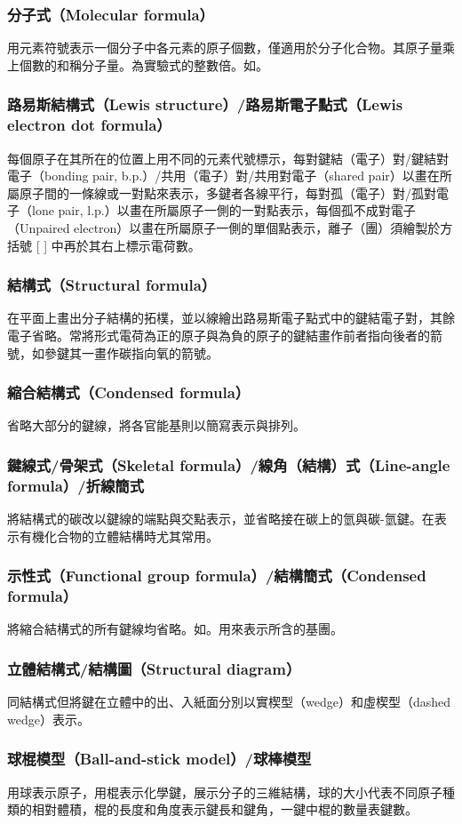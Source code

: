 \documentclass[a4paper,12pt]{article}
\begin{document}
\subsubsection{分子式（Molecular formula）}
用元素符號表示一個分子中各元素的原子個數，僅適用於分子化合物。其原子量乘上個數的和稱分子量。為實驗式的整數倍。如。
\subsubsection{路易斯結構式（Lewis structure）/路易斯電子點式（Lewis electron dot formula）}
每個原子在其所在的位置上用不同的元素代號標示，每對鍵結（電子）對/鍵結對電子（bonding pair, b.p.）/共用（電子）對/共用對電子（shared pair）以畫在所屬原子間的一條線或一對點來表示，多鍵者各線平行，每對孤（電子）對/孤對電子（lone pair, l.p.）以畫在所屬原子一側的一對點表示，每個孤不成對電子（Unpaired electron）以畫在所屬原子一側的單個點表示，離子（團）須繪製於方括號 [ ] 中再於其右上標示電荷數。
\subsubsection{結構式（Structural formula）}
在平面上畫出分子結構的拓樸，並以線繪出路易斯電子點式中的鍵結電子對，其餘電子省略。常將形式電荷為正的原子與為負的原子的鍵結畫作前者指向後者的箭號，如參鍵其一畫作碳指向氧的箭號。
\subsubsection{縮合結構式（Condensed formula）}
省略大部分的鍵線，將各官能基則以簡寫表示與排列。
\subsubsection{鍵線式/骨架式（Skeletal formula）/線角（結構）式（Line-angle formula）/折線簡式}
將結構式的碳改以鍵線的端點與交點表示，並省略接在碳上的氫與碳-氫鍵。在表示有機化合物的立體結構時尤其常用。
\subsubsection{示性式（Functional group formula）/結構簡式（Condensed formula）}
將縮合結構式的所有鍵線均省略。如。用來表示所含的基團。
\subsubsection{立體結構式/結構圖（Structural diagram）}
同結構式但將鍵在立體中的出、入紙面分別以實楔型（wedge）和虛楔型（dashed wedge）表示。
\subsubsection{球棍模型（Ball-and-stick model）/球棒模型}
用球表示原子，用棍表示化學鍵，展示分子的三維結構，球的大小代表不同原子種類的相對體積，棍的長度和角度表示鍵長和鍵角，一鍵中棍的數量表鍵數。
\end{document}
